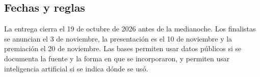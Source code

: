 \subsection{Fechas y reglas}
La entrega cierra el 19 de octubre de 2026 antes de la medianoche. Los finalistas se anuncian el 3 de noviembre, la
presentación es el 10 de noviembre y la premiación el 20 de noviembre. Las bases permiten usar datos públicos si se
documenta la fuente y la forma en que se incorporaron, y permiten usar inteligencia artificial si se indica dónde se
usó.
